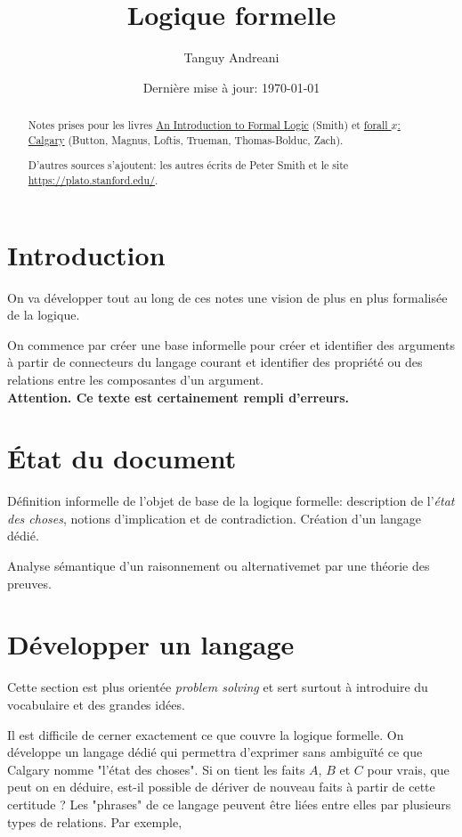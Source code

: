 \documentclass[fleqn,a4paper,nobib]{tufte-handout}
\title{Logique formelle}
\author{Tanguy Andreani}
\date{Dernière mise à jour: \today}
\begin{document}
\maketitle

\begin{abstract}
Notes prises pour les livres
\underline{An Introduction to Formal Logic} (Smith)
et \underline{forall $x$: Calgary} (Button, Magnus, Loftis, Trueman, Thomas-Bolduc, Zach).

D'autres sources s'ajoutent: les autres écrits de Peter Smith et le site
\url{https://plato.stanford.edu/}.
\end{abstract}

\tableofcontents

\section{Introduction}

On va développer tout au long de ces notes une vision de plus
en plus formalisée de la logique.

On commence par créer une base informelle pour créer et identifier
des arguments à partir de connecteurs du langage courant et identifier
des propriété ou des relations entre les composantes d'un argument.\\

\textbf{Attention. Ce texte est certainement rempli d'erreurs.}

\section*{État du document}

Définition informelle de l'objet de base de la logique formelle:
description de l'\emph{état des choses}, notions d'implication et
de contradiction. Création d'un langage dédié.

Analyse sémantique d'un raisonnement ou alternativemet
par une théorie des preuves.

\section{Développer un langage}

Cette section est plus orientée \textit{problem solving}
et sert surtout à introduire du vocabulaire et des grandes idées.

Il est difficile de cerner exactement ce que couvre la logique
formelle. On développe un langage dédié qui permettra d'exprimer
sans ambiguïté ce que Calgary nomme "l'état des choses". Si on tient
les faits $A$, $B$ et $C$ pour vrais, que peut on en déduire, est-il
possible de dériver de nouveau faits à partir de cette certitude ? Les
"phrases" de ce langage peuvent être liées entre elles par
plusieurs types de relations. Par exemple,
\end{document}
